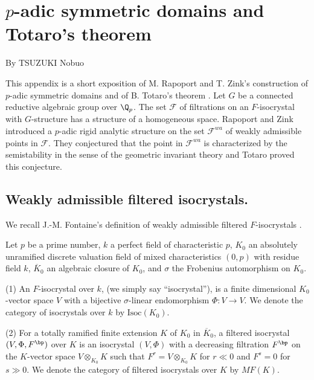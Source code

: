 \chapter{$p$-adic symmetric domains and Totaro's theorem}
\renewcommand{\thechapter}{\Alph{chapter}}

\vspace{1ex}
\begin{center}
By {\sc TSUZUKI Nobuo}
\end{center}
\vspace{10mm}

This appendix is a short exposition of 
M. Rapoport and T. Zink's construction of $p$-adic symmetric 
domains \cite{psfpg} and of B. Totaro's theorem \cite{tpipht}. 
Let $G$ be a connected reductive algebraic group over $\Q_p$. 
The set ${\mathcal F}$ of filtrations on an $F$-isocrystal with $G$-structure 
has a structure of a homogeneous space. 
Rapoport and Zink introduced a $p$-adic rigid analytic structure on 
the set ${\mathcal F}^{wa}$ of weakly admissible points in ${\mathcal F}$. 
They conjectured that the point in ${\mathcal F}^{wa}$ 
is characterized by the semistability 
in the sense of the geometric invariant theory \cite{git} 
and Totaro proved this conjecture. 

\section{Weakly admissible filtered isocrystals.}

We recall J.-M. Fontaine's definition of weakly admissible 
filtered $F$-isocrystals \cite{mgmfeadb}. 

\begin{apppara}
 Let $p$ be a prime number, $k$ a perfect field of 
 characteristic $p$, 
 $K_0$ an absolutely unramified discrete valuation field 
 of mixed characteristics $(0, p)$ with residue field $k$, 
 $\overline{K}_0$ an algebraic closure of $K_0$, 
 and $\sigma$ the Frobenius automorphism on $K_0$. 
\end{apppara}

\begin{appdfn}
 (1) An $F$-isocrystal over $k$, 
 (we simply say ``isocrystal''), is 
 a finite dimensional $K_0$-vector space $V$ 
 with a bijective $\sigma$-linear endomorphism $\Phi : V \rightarrow V$. 
 We denote the category of isocrystals over $k$ by $\mathrm{Isoc}(K_0)$. 

 (2) For a totally ramified finite extension $K$ of $K_0$ in $\overline{K}_0$, 
 a filtered isocrystal $(V, \Phi, F^{\bp})$ over $K$ 
 is an isocrystal $(V, \Phi)$ with a decreasing filtration $F^{\bp}$ 
 on the $K$-vector space $V \otimes_{K_0} K$ 
 such that $F^r = V \otimes_{K_0} K$ 
 for $r \ll 0$ and $F^s = 0$ for $s \gg 0$. 
 We denote the category of filtered isocrystals over $K$ by $MF(K)$. 
\end{appdfn}

